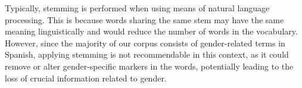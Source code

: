 
Typically, stemming is performed when using means of natural language processing. This is because words sharing the same stem may have the same meaning linguistically and would reduce the number of words in the vocabulary. However, since the majority of our corpus consists of gender-related terms in Spanish, applying stemming is not recommendable in this context, as it could remove or alter gender-specific markers in the words, potentially leading to the loss of crucial information related to gender.

\newpage